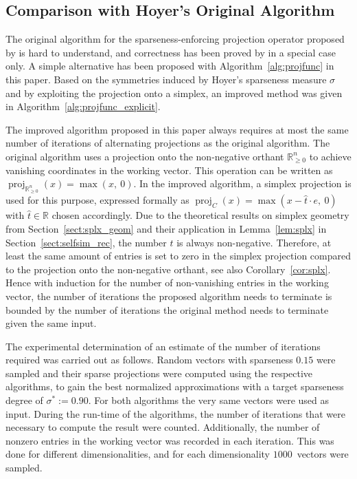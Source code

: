 \documentclass[twoside,11pt]{article}
\DeclareMathOperator{\proj}{proj}
\newcommand{\R}{\mathbb{R}}
\newcommand{\0}{\mathcal{O}}
\begin{document}
\subsection{Comparison with Hoyer's Original Algorithm}
\label{sect:comp_hoyer}
The original algorithm for the sparseness-enforcing projection operator proposed by \cite{Hoyer2004} is hard to understand, and correctness has been proved by \cite{Theis2005} in a special case only.
A simple alternative has been proposed with Algorithm~\ref{alg:projfunc} in this paper.
Based on the symmetries induced by Hoyer's sparseness measure $\sigma$ and by exploiting the projection onto a simplex, an improved method was given in Algorithm~\ref{alg:projfunc_explicit}.

The improved algorithm proposed in this paper always requires at most the same number of iterations of alternating projections as the original algorithm.
The original algorithm uses a projection onto the non-negative orthant $\R_{\geq 0}^n$ to achieve vanishing coordinates in the working vector.
This operation can be written as $\proj_{\R_{\geq 0}^n}(x) = \max(x,\ 0)$.
In the improved algorithm, a simplex projection is used for this purpose, expressed formally as $\proj_C(x) = \max\left(x - \hat{t}\cdot e,\ 0\right)$ with $\hat{t}\in\R$ chosen accordingly.
Due to the theoretical results on simplex geometry from Section~\ref{sect:splx_geom} and their application in Lemma~\ref{lem:splx} in Section~\ref{sect:selfsim_rec}, the number $\hat{t}$ is always non-negative.
Therefore, at least the same amount of entries is set to zero in the simplex projection compared to the projection onto the non-negative orthant, see also Corollary~\ref{cor:splx}.
Hence with induction for the number of non-vanishing entries in the working vector, the number of iterations the proposed algorithm needs to terminate is bounded by the number of iterations the original method needs to terminate given the same input.

The experimental determination of an estimate of the number of iterations required was carried out as follows.
Random vectors with sparseness $0.15$ were sampled and their sparse projections were computed using the respective algorithms, to gain the best normalized approximations with a target sparseness degree of $\sigma^* := 0.90$.
For both algorithms the very same vectors were used as input.
During the run-time of the algorithms, the number of iterations that were necessary to compute the result were counted.
Additionally, the number of nonzero entries in the working vector was recorded in each iteration.
This was done for different dimensionalities, and for each dimensionality $1000$~vectors were sampled.
\end{document}

